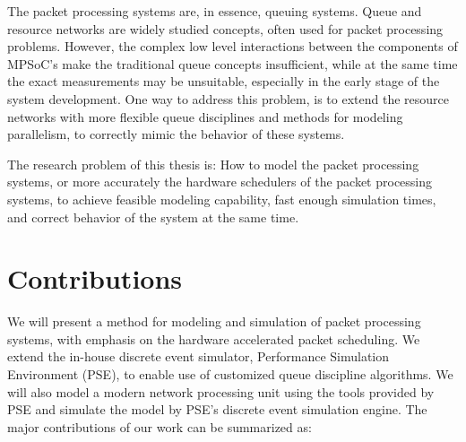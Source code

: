 
The packet processing systems are, in essence, queuing systems. Queue and resource networks are widely studied concepts, often used for packet processing problems. However, the complex low level interactions between the components of MPSoC's make the traditional queue concepts insufficient, while at the same time the exact measurements may be unsuitable, especially in the early stage of the system development. One way to address this problem, is to extend the resource networks with more flexible queue disciplines and methods for modeling parallelism, to correctly mimic the behavior of these systems.

The research problem of this thesis is: How to model the packet processing systems, or more accurately the hardware schedulers of the packet processing systems, to achieve feasible modeling capability, fast enough simulation times, and correct behavior of the system at the same time.

\section{Contributions}
We will present a method for modeling and simulation of packet processing systems, with emphasis on the hardware accelerated packet scheduling. We extend the in-house discrete event simulator, Performance Simulation Environment (PSE), to enable use of customized queue discipline algorithms. We will also model a modern network processing unit using the tools provided by PSE and simulate the model by PSE's discrete event simulation engine. The major contributions of our work can be summarized as:



